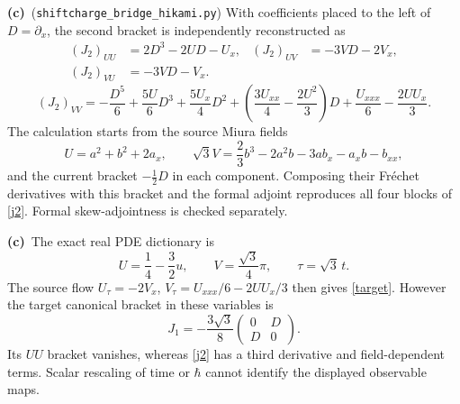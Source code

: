 \documentclass[11pt,a4paper]{article}
\newcommand{\C}{\textbf{(c)}\ }
\newcommand{\D}{\textbf{(d)}\ }
\newcommand{\file}[1]{\nolinkurl{#1}}
\newcommand{\hk}{\file{shiftcharge_bridge_hikami.py}}
\begin{document}
\C (\hk) With coefficients placed to the left of $D=\partial_x$, the
second bracket is independently reconstructed as
\begin{align}
 (J_2)_{UU}&=2D^3-2UD-U_x,&
 (J_2)_{UV}&=-3VD-2V_x, \nonumber\\
 (J_2)_{VU}&=-3VD-V_x.&& \nonumber
\end{align}
\begin{equation}
 (J_2)_{VV}=-\frac{D^5}{6}+\frac{5U}{6}D^3+\frac{5U_x}{4}D^2
 +\left(\frac{3U_{xx}}4-\frac{2U^2}3\right)D
 +\frac{U_{xxx}}6-\frac{2UU_x}3 .
 \label{j2}
\end{equation}
The calculation starts from the source Miura fields
\begin{equation}
 U=a^2+b^2+2a_x,\qquad
 \sqrt3V=\frac23b^3-2a^2b-3ab_x-a_xb-b_{xx},
 \label{miura}
\end{equation}
and the current bracket $-\tfrac12D$ in each component. Composing their
Fr\'echet derivatives with this bracket and the formal adjoint reproduces
all four blocks of \eqref{j2}. Formal skew-adjointness is checked separately.

\C The exact real PDE dictionary is
\begin{equation}
 U=\frac14-\frac32u,\qquad V=\frac{\sqrt3}{4}\pi,\qquad
 \tau=\sqrt3\,t.
 \label{dictionary}
\end{equation}
The source flow $U_\tau=-2V_x$,
$V_\tau=U_{xxx}/6-2UU_x/3$ then gives \eqref{target}.
However the target canonical bracket in these variables is
\begin{equation}
 J_1=-\frac{3\sqrt3}{8}
 \begin{pmatrix}0&D\\D&0\end{pmatrix}.
 \label{j1}
\end{equation}
Its $UU$ bracket vanishes, whereas \eqref{j2} has a third derivative and
field-dependent terms. Scalar rescaling of time or $\hbar$ cannot identify
the displayed observable maps.
\end{document}
